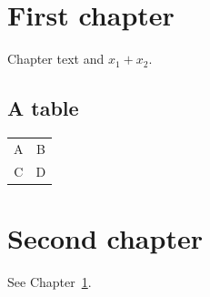 \documentclass{report}
\begin{document}
\tableofcontents
\chapter{First chapter}\label{chap:first}
Chapter text and $x_1+x_2$.
\section{A table}
\begin{tabular}{cc}A&B\\C&D\end{tabular}
\chapter{Second chapter}
See Chapter~\ref{chap:first}.
\end{document}
